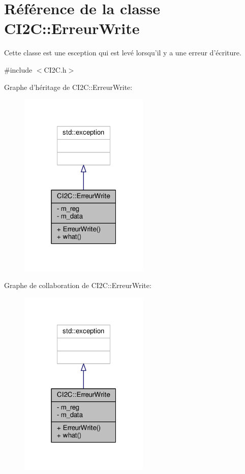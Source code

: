 \hypertarget{classCI2C_1_1ErreurWrite}{\section{Référence de la classe C\+I2\+C\+:\+:Erreur\+Write}
\label{classCI2C_1_1ErreurWrite}
}


Cette classe est une esception qui est levé lorsqu'il y a une erreur d'écriture.  




{\ttfamily \#include $<$C\+I2\+C.\+h$>$}



Graphe d'héritage de C\+I2\+C\+:\+:Erreur\+Write\+:\nopagebreak
\begin{figure}[H]
\begin{center}
\leavevmode
\includegraphics[width=175pt]{classCI2C_1_1ErreurWrite__inherit__graph}
\end{center}
\end{figure}


Graphe de collaboration de C\+I2\+C\+:\+:Erreur\+Write\+:\nopagebreak
\begin{figure}[H]
\begin{center}
\leavevmode
\includegraphics[width=175pt]{classCI2C_1_1ErreurWrite__coll__graph}
\end{center}
\end{figure}
